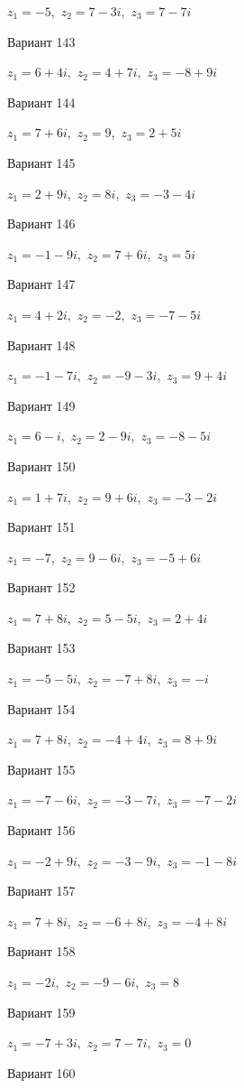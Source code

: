 \documentclass[11pt]{report}
\begin{document}
$z_1 = -5$,\ $z_2 = 7 - 3 i$,\ $z_3 = 7 - 7 i$

Вариант 143

$z_1 = 6 + 4 i$,\ $z_2 = 4 + 7 i$,\ $z_3 = -8 + 9 i$

Вариант 144

$z_1 = 7 + 6 i$,\ $z_2 = 9$,\ $z_3 = 2 + 5 i$

Вариант 145

$z_1 = 2 + 9 i$,\ $z_2 = 8 i$,\ $z_3 = -3 - 4 i$

Вариант 146

$z_1 = -1 - 9 i$,\ $z_2 = 7 + 6 i$,\ $z_3 = 5 i$

Вариант 147

$z_1 = 4 + 2 i$,\ $z_2 = -2$,\ $z_3 = -7 - 5 i$

Вариант 148

$z_1 = -1 - 7 i$,\ $z_2 = -9 - 3 i$,\ $z_3 = 9 + 4 i$

Вариант 149

$z_1 = 6 - i$,\ $z_2 = 2 - 9 i$,\ $z_3 = -8 - 5 i$

Вариант 150

$z_1 = 1 + 7 i$,\ $z_2 = 9 + 6 i$,\ $z_3 = -3 - 2 i$

Вариант 151

$z_1 = -7$,\ $z_2 = 9 - 6 i$,\ $z_3 = -5 + 6 i$

Вариант 152

$z_1 = 7 + 8 i$,\ $z_2 = 5 - 5 i$,\ $z_3 = 2 + 4 i$

Вариант 153

$z_1 = -5 - 5 i$,\ $z_2 = -7 + 8 i$,\ $z_3 = - i$

Вариант 154

$z_1 = 7 + 8 i$,\ $z_2 = -4 + 4 i$,\ $z_3 = 8 + 9 i$

Вариант 155

$z_1 = -7 - 6 i$,\ $z_2 = -3 - 7 i$,\ $z_3 = -7 - 2 i$

Вариант 156

$z_1 = -2 + 9 i$,\ $z_2 = -3 - 9 i$,\ $z_3 = -1 - 8 i$

Вариант 157

$z_1 = 7 + 8 i$,\ $z_2 = -6 + 8 i$,\ $z_3 = -4 + 8 i$

Вариант 158

$z_1 = - 2 i$,\ $z_2 = -9 - 6 i$,\ $z_3 = 8$

Вариант 159

$z_1 = -7 + 3 i$,\ $z_2 = 7 - 7 i$,\ $z_3 = 0$

Вариант 160
\end{document}
